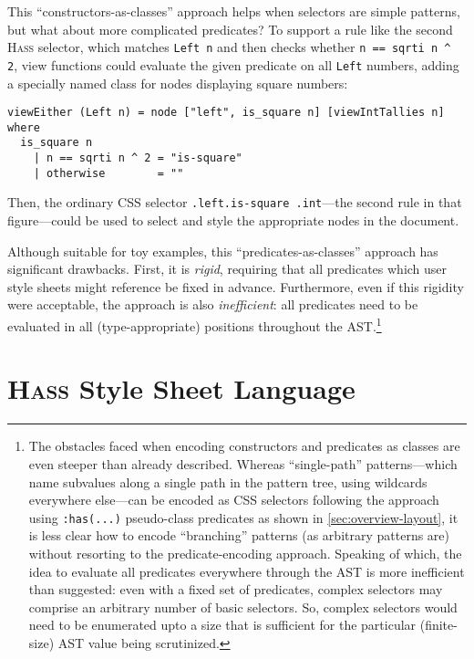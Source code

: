 \documentclass[acmsmall, screen]{acmart}
\newcommand{\hass}
{\textsc{Hass}}
\newcommand{\cssClass}[1]
  {\texttt{#1}}
\begin{document}
This ``constructors-as-classes'' approach helps when selectors are simple patterns, but what about more complicated predicates?
To support a rule like the second \hass{} selector, which matches \texttt{Left n} and then checks whether \verb+n == sqrti n ^ 2+, view functions could evaluate the given predicate on all \texttt{Left} numbers, adding a specially named class for nodes displaying square numbers:

{\small

\begin{Verbatim}[xleftmargin=\parindent]
viewEither (Left n) = node ["left", is_square n] [viewIntTallies n] where
  is_square n
    | n == sqrti n ^ 2 = "is-square"
    | otherwise        = ""
\end{Verbatim}

}

\noindent
Then, the ordinary CSS selector \cssClass{.left.is-square .int}---the second rule in that figure---could be used to select and style the appropriate nodes in the document.

Although suitable for toy examples, this ``predicates-as-classes'' approach has significant drawbacks.
First, it is \emph{rigid}, requiring that all predicates which user style sheets might reference be fixed in advance.
Furthermore, even if this rigidity were acceptable, the approach is also \emph{inefficient}: all predicates need to be evaluated in all (type-appropriate) positions throughout the AST.\footnote{
The obstacles faced when encoding constructors and predicates as classes are even steeper than already described.
Whereas ``single-path'' patterns---which name subvalues along a single path in the pattern tree, using wildcards everywhere else---can be encoded as CSS selectors following the approach using \texttt{:has(...)} pseudo-class predicates as shown in \autoref{sec:overview-layout}, it is less clear how to encode ``branching'' patterns (as arbitrary patterns are) without resorting to the predicate-encoding approach.
Speaking of which, the idea to evaluate all predicates everywhere through the AST is more inefficient than suggested: even with a fixed set of predicates, complex selectors may comprise an arbitrary number of basic selectors.
So, complex selectors would need to be enumerated upto a size that is sufficient for the particular (finite-size) AST value being scrutinized.
}

 
\clearpage
\section{\hass{} Style Sheet Language}
\label{sec:style-computation}
\end{document}
